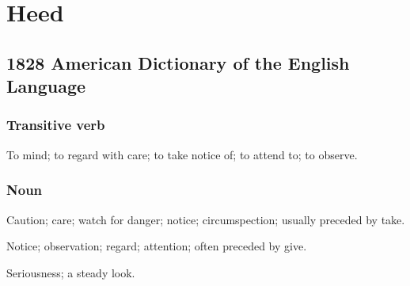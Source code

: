 \section{Heed}
	\label{HEED}
	

\subsection{1828 American Dictionary of the English Language} %
	\label{HEED-1828}
	
	\subsubsection{Transitive verb}

		\begin{compactitem}
			\item To mind; to regard with care; to take notice of; to attend to; to observe.
		\end{compactitem}
		
	\subsubsection{Noun}
	
		\begin{compactitem}
			\item[1] Caution; care; watch for danger; notice; circumspection; usually preceded by take.
			\item[2] Notice; observation; regard; attention; often preceded by give.
			\item[3] Seriousness; a steady look.
		\end{compactitem}




